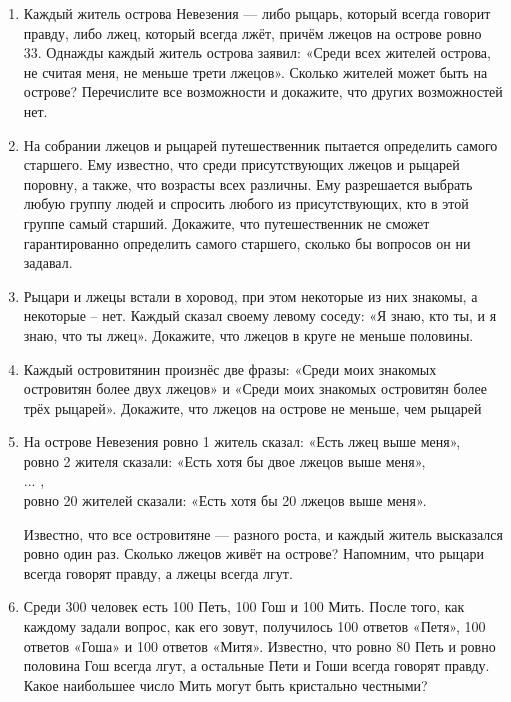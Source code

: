 
\begin{enumerate}

    \item 
    Каждый житель острова Невезения — либо рыцарь, который всегда говорит правду, либо лжец, который всегда лжёт, причём лжецов на острове ровно 33. Однажды каждый житель острова заявил: «Среди всех жителей острова, не считая меня, не меньше трети лжецов». Сколько жителей может быть на острове? Перечислите все возможности и докажите, что других возможностей нет.
    
    \item 
    На собрании лжецов и рыцарей путешественник пытается определить самого старшего. Ему известно, что среди присутствующих лжецов и рыцарей поровну, а также, что возрасты всех различны. Ему разрешается выбрать любую группу людей и спросить любого из присутствующих, кто в этой группе самый старший. Докажите, что путешественник не сможет гарантированно определить самого старшего, сколько бы вопросов он ни задавал.
    
    \item 
    Рыцари и лжецы встали в хоровод, при этом некоторые из них знакомы, а некоторые -- нет. Каждый сказал своему левому соседу: «Я знаю, кто ты, и я знаю, что ты лжец». Докажите, что лжецов в круге не меньше половины.
    
    \item 
    Каждый островитянин произнёс две фразы: «Среди моих знакомых островитян более двух лжецов» и «Среди моих знакомых островитян более трёх рыцарей». Докажите, что лжецов на острове не меньше, чем рыцарей

    \item 
    На острове Невезения ровно 1 житель сказал: «Есть лжец выше меня», 
    \\ ровно 2 жителя сказали: «Есть хотя бы двое лжецов выше меня», 
    \\ ... , 
    \\ ровно 20 жителей сказали: «Есть хотя бы 20 лжецов выше меня». 
    \par Известно, что все островитяне — разного роста, и каждый житель высказался ровно один раз. Сколько лжецов живёт на острове? Напомним, что рыцари всегда говорят правду, а лжецы всегда лгут.

    \item 
    Среди 300 человек есть 100 Петь, 100 Гош и 100 Мить. После того, как каждому задали вопрос, как его зовут, получилось 100 ответов «Петя», 100 ответов «Гоша» и 100 ответов «Митя». Известно, что ровно 80 Петь и ровно половина Гош всегда лгут, а остальные Пети и Гоши всегда говорят правду. Какое наибольшее число Мить могут быть кристально честными?


\end{enumerate}
